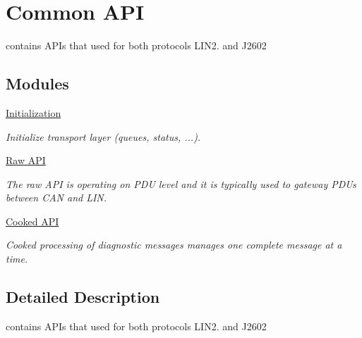 \hypertarget{group__commontl__api__group}{}\section{Common A\+P\+I}
\label{group__commontl__api__group}


contains A\+P\+Is that used for both protocols L\+I\+N2. and J2602  


\subsection*{Modules}
\begin{DoxyCompactItemize}
\item 
\hyperlink{group__initialization__group}{Initialization}
\begin{DoxyCompactList}\small\item\em Initialize transport layer (queues, status, ...). \end{DoxyCompactList}\item 
\hyperlink{group__raw__api__group}{Raw A\+P\+I}
\begin{DoxyCompactList}\small\item\em The raw A\+P\+I is operating on P\+D\+U level and it is typically used to gateway P\+D\+Us between C\+A\+N and L\+I\+N. \end{DoxyCompactList}\item 
\hyperlink{group__cooked__api__group}{Cooked A\+P\+I}
\begin{DoxyCompactList}\small\item\em Cooked processing of diagnostic messages manages one complete message at a time. \end{DoxyCompactList}\end{DoxyCompactItemize}


\subsection{Detailed Description}
contains A\+P\+Is that used for both protocols L\+I\+N2. and J2602 


